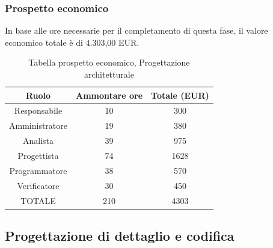 \subsubsection{Prospetto economico}
In base alle ore necessarie per il completamento di questa fase, il valore economico totale è di 4.303,00 EUR.
\begin{table}[h]
	\caption{Tabella prospetto economico, Progettazione architetturale}  
\begin{center}
\begin{tabular}{ |c|c|c|  }
 \hline
 Ruolo 		& Ammontare ore 	& Totale (EUR)\\
 	\hline
 \hline
 	Responsabile	& 10 	& 300\\
	Amministratore	& 19		& 380\\
	Analista		& 39 	& 975\\
	Progettista		& 74		& 1628\\
	Programmatore	& 38		& 570\\
	Verificatore	& 30 	& 450\\
 \hline\hline
 TOTALE		& 210		& 4303\\
  \hline
\end{tabular}
\end{center}
\end{table}
\newpage
\subsection{Progettazione di dettaglio e codifica}
